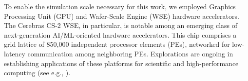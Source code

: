 


To enable the simulation scale necessary for this work, we employed Graphics Processing Unit (GPU) and Wafer-Scale Engine (WSE) hardware accelerators.
The Cerebras CS-2 WSE, in particular, is notable among an emerging class of next-generation AI/ML-oriented hardware accelerators.%
This chip comprises a grid lattice of 850,000 independent processor elements (PEs), networked for low-latency communication among neighboring PEs.
Explorations are ongoing in establishing applications of these platforms for scientific and high-performance computing (see e.g., \citep{rocki2020fast,ltaief2023scaling,sai2023massively}).

